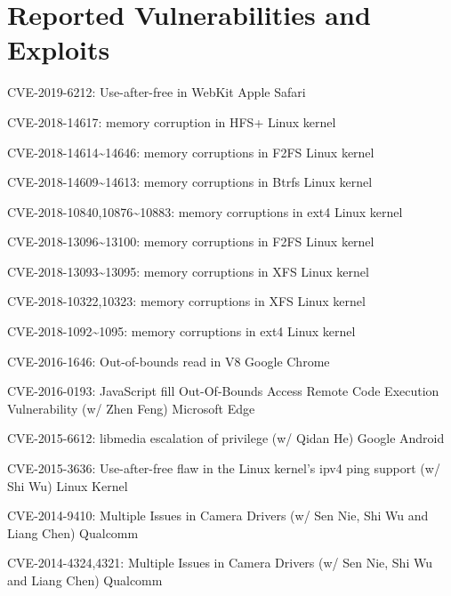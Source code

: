 \section*{Reported Vulnerabilities and Exploits}
\begin{description}
    \item CVE-2019-6212: Use-after-free in WebKit \dotfill Apple Safari
	\item CVE-2018-14617: memory corruption in HFS+ \dotfill Linux kernel
	\item CVE-2018-14614\textasciitilde14646: memory corruptions in F2FS \dotfill Linux kernel
	\item CVE-2018-14609\textasciitilde14613: memory corruptions in Btrfs \dotfill Linux kernel
	\item CVE-2018-10840,10876\textasciitilde10883: memory corruptions in ext4 \dotfill Linux kernel
	\item CVE-2018-13096\textasciitilde13100: memory corruptions in F2FS \dotfill Linux kernel
	\item CVE-2018-13093\textasciitilde13095: memory corruptions in XFS \dotfill Linux kernel
	\item CVE-2018-10322,10323: memory corruptions in XFS \dotfill Linux kernel
	\item CVE-2018-1092\textasciitilde1095: memory corruptions in ext4 \dotfill Linux kernel
	\item CVE-2016-1646: Out-of-bounds read in V8 \dotfill Google Chrome
	\item CVE-2016-0193: JavaScript fill Out-Of-Bounds Access Remote Code Execution Vulnerability (w/ Zhen Feng) \dotfill Microsoft Edge
	\item CVE-2015-6612: libmedia escalation of privilege (w/ Qidan He) \dotfill Google Android
	\item CVE-2015-3636: Use-after-free flaw in the Linux kernel’s ipv4 ping support (w/ Shi Wu) \dotfill Linux Kernel
	\item CVE-2014-9410: Multiple Issues in Camera Drivers (w/ Sen Nie, Shi Wu and Liang Chen) \dotfill Qualcomm
	\item CVE-2014-4324,4321: Multiple Issues in Camera Drivers (w/ Sen Nie, Shi Wu and Liang Chen) \dotfill Qualcomm
\end{description}

